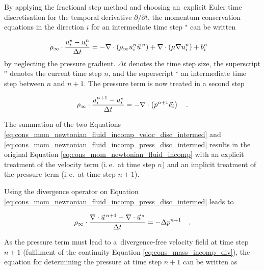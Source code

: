 \documentclass[10pt, conference, compsocconf]{IEEEtran}
\begin{document}
By applying the fractional step method and choosing an~explicit Euler time discretisation for the temporal derivative $\partial/\partial t$, the momentum conservation equations in the direction $i$ for an intermediate time step $^\star$ can be written \vspace{-6pt}

\begin{equation}
\label{eq:cons_mom_newtonian_fluid_incomp_veloc_disc_intermed}
\rho_\infty \cdot \frac{u_i^\star - u_i^n}{\Delta t} = - \nabla \cdot (\rho_\infty u_i^n \vec u^{\,n}) + \nabla \cdot \left( \mu \nabla u_i^n \right) + b_i^n \quad \vspace{6pt}
\end{equation}
by neglecting the pressure gradient. $\Delta t$ denotes the time step size, the superscript $^n$ denotes the current time step $n$, and the superscript $^\star$ an intermediate time step between $n$ and $n+1$. The pressure term is now treated in a second step \vspace{-3pt}

\begin{equation}
\label{eq:cons_mom_newtonian_fluid_incomp_press_disc_intermed}
\rho_\infty \cdot \frac{u_i^{n+1} - u_i^\star}{\Delta t} = - \nabla \cdot \left(p^{n+1} \vec e_i \right) \quad .\vspace{4pt}
\end{equation}

The summation of the two Equations \eqref{eq:cons_mom_newtonian_fluid_incomp_veloc_disc_intermed} and \eqref{eq:cons_mom_newtonian_fluid_incomp_press_disc_intermed} results in the original Equation \eqref{eq:cons_mom_newtonian_fluid_incomp} with an explicit treatment of the velocity term (i.\,e.\ at time step $n$) and an implicit treatment of the pressure term (i.\,e.\ at time step $n+1$).

Using the divergence operator on Equation \eqref{eq:cons_mom_newtonian_fluid_incomp_press_disc_intermed} leads to \vspace{-2pt}

\begin{equation}
\label{eq:cons_mom_newtonian_fluid_incomp_press_disc_intermed_diveq}
\rho_\infty \cdot \frac{\nabla \cdot \vec u^{\,n+1} - \nabla \cdot \vec u^{\,\star}}{\Delta t} = - \Delta p^{n+1} \quad .\vspace{6pt}
\end{equation}

As the pressure term must lead to a~divergence-free velocity field at time step $n+1$ (fulfilment of the continuity Equation \eqref{eq:cons_mass_incomp_div}), the equation for determining the pressure at time step $n+1$ can be written as \vspace{-4pt}
\end{document}

